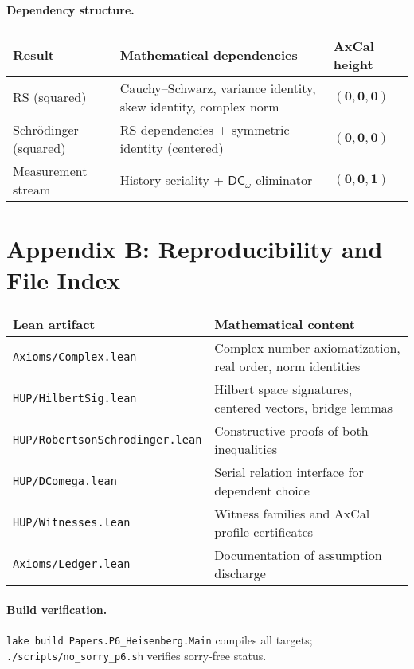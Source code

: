 \documentclass[11pt]{article}
\newcommand{\DCw}{\mathsf{DC}_{\omega}}
\theoremstyle{plain}
\theoremstyle{definition}
\theoremstyle{remark}
\begin{document}
\paragraph{Dependency structure.}
\begin{center}
\begin{tabular}{@{}lll@{}}
\toprule
\textbf{Result} & \textbf{Mathematical dependencies} & \textbf{AxCal height} \\
\midrule
RS (squared) & Cauchy--Schwarz, variance identity, skew identity, complex norm & $(\mathbf{0},\mathbf{0},\mathbf{0})$ \\
Schrödinger (squared) & RS dependencies + symmetric identity (centered) & $(\mathbf{0},\mathbf{0},\mathbf{0})$ \\
Measurement stream & History seriality + $\DCw$ eliminator & $(\mathbf{0},\mathbf{0},\mathbf{1})$ \\
\bottomrule
\end{tabular}
\end{center}

\section*{Appendix B: Reproducibility and File Index}

\begin{center}
\begin{tabular}{ll}
\toprule
\textbf{Lean artifact} & \textbf{Mathematical content} \\
\midrule
\verb|Axioms/Complex.lean| & Complex number axiomatization, real order, norm identities \\
\verb|HUP/HilbertSig.lean| & Hilbert space signatures, centered vectors, bridge lemmas \\
\verb|HUP/RobertsonSchrodinger.lean| & Constructive proofs of both inequalities \\
\verb|HUP/DComega.lean| & Serial relation interface for dependent choice \\
\verb|HUP/Witnesses.lean| & Witness families and AxCal profile certificates \\
\verb|Axioms/Ledger.lean| & Documentation of assumption discharge \\
\bottomrule
\end{tabular}
\end{center}

\paragraph{Build verification.}
\texttt{lake build Papers.P6\_Heisenberg.Main} compiles all targets; \texttt{./scripts/no\_sorry\_p6.sh} verifies sorry-free status.
\end{document}
